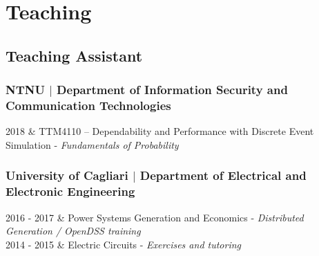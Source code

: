 \documentclass[11pt]{article}
\begin{document}
\section*{Teaching}


\subsection*{Teaching Assistant}
\subsubsection*{NTNU $\mid$ Department of Information Security and Communication Technologies}
\begin{tabularx}{\linewidth}{\twocols}
  2018 & TTM4110 – Dependability and Performance with Discrete Event Simulation - \textit{Fundamentals of Probability}\\
\end{tabularx}
\subsubsection*{University of Cagliari $\mid$ Department of Electrical and Electronic Engineering}
\begin{tabularx}{\linewidth}{\twocols}
2016 - 2017 & Power Systems Generation and Economics - \textit{Distributed Generation / OpenDSS training}\\
2014 - 2015 & Electric Circuits - \textit{Exercises and tutoring} \\
\end{tabularx}
\end{document}
